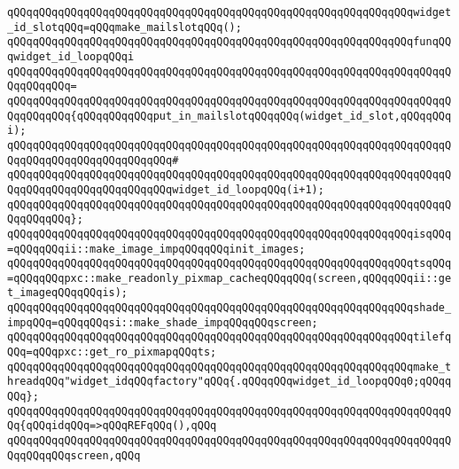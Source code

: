\verb|qQQqqQQqqQQqqQQqqQQqqQQqqQQqqQQqqQQqqQQqqQQqqQQqqQQqqQQqqQQqqQQqwidget_id_slotqQQq=qQQqmake_mailslotqQQq();|\newline
\newline
\verb|qQQqqQQqqQQqqQQqqQQqqQQqqQQqqQQqqQQqqQQqqQQqqQQqqQQqqQQqqQQqqQQqfunqQQqwidget_id_loopqQQqi|\newline
\verb|qQQqqQQqqQQqqQQqqQQqqQQqqQQqqQQqqQQqqQQqqQQqqQQqqQQqqQQqqQQqqQQqqQQqqQQqqQQqqQQq=|\newline
\verb|qQQqqQQqqQQqqQQqqQQqqQQqqQQqqQQqqQQqqQQqqQQqqQQqqQQqqQQqqQQqqQQqqQQqqQQqqQQqqQQq{qQQqqQQqqQQqput_in_mailslotqQQqqQQq(widget_id_slot,qQQqqQQqi);|\newline
\verb|qQQqqQQqqQQqqQQqqQQqqQQqqQQqqQQqqQQqqQQqqQQqqQQqqQQqqQQqqQQqqQQqqQQqqQQqqQQqqQQqqQQqqQQqqQQqqQQq#|\newline
\verb|qQQqqQQqqQQqqQQqqQQqqQQqqQQqqQQqqQQqqQQqqQQqqQQqqQQqqQQqqQQqqQQqqQQqqQQqqQQqqQQqqQQqqQQqqQQqqQQqwidget_id_loopqQQq(i+1);|\newline
\verb|qQQqqQQqqQQqqQQqqQQqqQQqqQQqqQQqqQQqqQQqqQQqqQQqqQQqqQQqqQQqqQQqqQQqqQQqqQQqqQQq};|\newline
\newline
\verb|qQQqqQQqqQQqqQQqqQQqqQQqqQQqqQQqqQQqqQQqqQQqqQQqqQQqqQQqqQQqqQQqisqQQq=qQQqqQQqii::make_image_impqQQqqQQqinit_images;|\newline
\newline
\verb|qQQqqQQqqQQqqQQqqQQqqQQqqQQqqQQqqQQqqQQqqQQqqQQqqQQqqQQqqQQqqQQqtsqQQq=qQQqqQQqpxc::make_readonly_pixmap_cacheqQQqqQQq(screen,qQQqqQQqii::get_imageqQQqqQQqis);|\newline
\newline
\verb|qQQqqQQqqQQqqQQqqQQqqQQqqQQqqQQqqQQqqQQqqQQqqQQqqQQqqQQqqQQqqQQqshade_impqQQq=qQQqqQQqsi::make_shade_impqQQqqQQqscreen;|\newline
\newline
\verb|qQQqqQQqqQQqqQQqqQQqqQQqqQQqqQQqqQQqqQQqqQQqqQQqqQQqqQQqqQQqqQQqtilefqQQq=qQQqpxc::get_ro_pixmapqQQqts;|\newline
\newline
\verb|qQQqqQQqqQQqqQQqqQQqqQQqqQQqqQQqqQQqqQQqqQQqqQQqqQQqqQQqqQQqqQQqmake_threadqQQq"widget_idqQQqfactory"qQQq{.qQQqqQQqwidget_id_loopqQQq0;qQQqqQQq};|\newline
\newline
\verb|qQQqqQQqqQQqqQQqqQQqqQQqqQQqqQQqqQQqqQQqqQQqqQQqqQQqqQQqqQQqqQQqqQQqqQQq{qQQqidqQQq=>qQQqREFqQQq(),qQQq|\newline
\verb|qQQqqQQqqQQqqQQqqQQqqQQqqQQqqQQqqQQqqQQqqQQqqQQqqQQqqQQqqQQqqQQqqQQqqQQqqQQqqQQqscreen,qQQq|\newline
